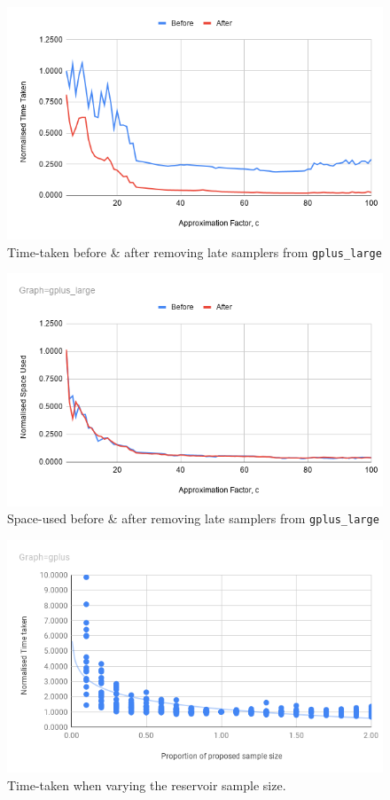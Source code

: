 \documentclass[11pt,twoside,a4paper]{report}
\begin{document}
\begin{figure}
	\label{Figure 7}
  \includegraphics[width=\textwidth]{img/reducedSamplersGPlusTime.png}
	\caption{Time-taken before \& after removing late samplers from \texttt{gplus\_large}}
\end{figure}
\begin{figure}
	\label{Figure 8}
  \includegraphics[width=\textwidth]{img/reducedSamplersGPlusSpace.png}
	\caption{Space-used before \& after removing late samplers from \texttt{gplus\_large}}
\end{figure}
\begin{figure}
	\label{Figure 9}
  \includegraphics[width=\textwidth]{img/variedSampleSizeTime.png}
	\caption{Time-taken when varying the reservoir sample size.}
\end{figure}
\end{document}
